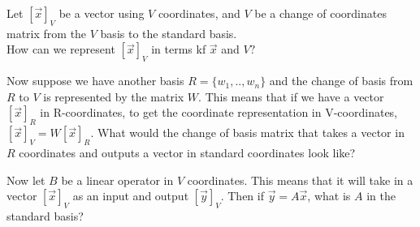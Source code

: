   \begin{enumerate}[resume]
  \qitem Let $[\vec{x}]_V$ be a vector using $V$ coordinates, and $V$ be a change of coordinates matrix from the $V$ basis to the standard basis. \\
  How can we represent $[\vec{x}]_V$ in terms kf $\vec{x}$ and $V?$

  \qitem Now suppose we have another basis $R = \{w_1, .. , w_n\}$ and the change of basis from $R$ to $V$ is represented by the matrix $W.$ This means that if we have a vector $[\vec{x}]_R$ in R-coordinates, to get the coordinate representation in V-coordinates, $[\vec{x}]_V = W[\vec{x}]_R.$ What would the change of basis matrix that takes a vector in $R$ coordinates and outputs a vector in standard coordinates look like?



  \qitem Now let $B$ be a linear operator in $V$ coordinates.
  This means that it will take in a vector $[\vec{x}]_V$ as an input and output $[\vec{y}]_V$.
  Then if $\vec{y} = A \vec{x}$, what is $A$ in the standard basis?


\end{enumerate}
